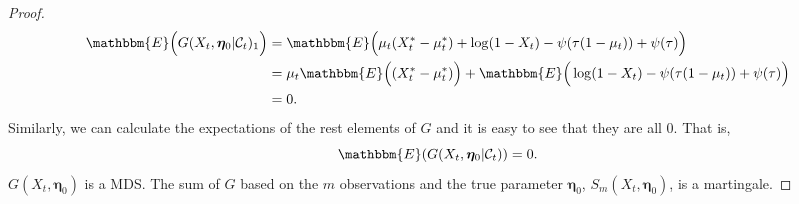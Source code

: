 \documentclass[10pt,a4paper]{amsart}
\begin{document}
\begin{proof}
\begin{equation*}
\begin{aligned}
    \mathbbm{E}\Big(G(X_t, \bm{\eta}_0|\mathcal{C}_t)_1\Big) &= \mathbbm{E}\Big(\mu_t(X_t^*-\mu_t^*)+\log(1-X_t)-\psi(\tau(1-\mu_t))+\psi(\tau)\Big) \\
    & =  \mu_t\mathbbm{E}\Big((X_t^*-\mu_t^*)\Big) + \mathbbm{E}\Big(\log(1-X_t)-\psi(\tau(1-\mu_t))+\psi(\tau)\Big) \\
    &= 0 .
\end{aligned}
\end{equation*}
Similarly, we can calculate the expectations of the rest elements of $G$ and it is easy to see that they are all 0. That is,
\begin{equation*}
    \mathbbm{E}(G(X_t, \bm{\eta}_0|\mathcal{C}_t)) = 0.
\end{equation*}
$G(X_t, \bm{\eta}_0)$ is a MDS. The sum of $G$ based on the $m$ observations and the true parameter $\bm{\eta}_0$, $S_m(X_t, \bm{\eta}_0)$, is a martingale.
\end{proof} 
\end{document}
